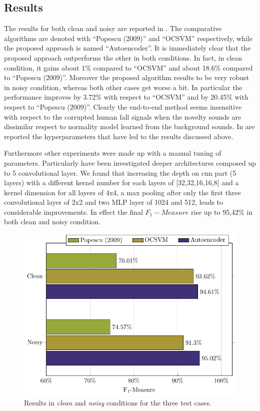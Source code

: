 \subsection{Results}
The results for both clean and noisy are reported in . The comparative algorithms are denoted with ``Popescu (2009)'' and ``OCSVM'' respectively, while the proposed approach is named ``Autoencoder''. It is immediately clear that the proposed approach outperforms the other in both conditions. In fact, in clean condition, it gains about 1\% compared to ``OCSVM'' and about 18.6\% compared to ``Popescu (2009)''. Moreover the proposed algorithm results to be very robust in noisy condition, %
whereas both other cases get worse a bit.
In particular the performance improves by 3.72\% with respect to ``OCSVM'' and by 20.45\% with respect to ``Popescu (2009)''. Clearly the end-to-end method seems insensitive with respect to the corrupted human fall signals when the novelty sounds are dissimilar respect to normality model learned from the background sounds. 
In  are reported the hyperparameters that have led to the results discussed above.

Furthermore other experiments were made up with a manual tuning of parameters. Particularly have been investigated deeper architectures composed up to 5 convolutional layer. We found that increasing the depth on cnn part (5 layers) with a different kernel number for each layers of [32,32,16,16,8] and a kernel dimension for all layers of 4x4, a max pooling after only the first three convolutional layer of 2x2 and two MLP layer of 1024 and 512, leads to considerable improvements. In effect the final $ F_1 -Measure$ rise up to 95,42\%  in both clean and noisy condition. 


\begin{figure}[t]
	\centering
	\includegraphics[width=0.75\columnwidth]{img/wirn2017/grafTex/results.pdf}
	\caption{Results in \textit{clean} and \textit{noisy} conditions for the three test cases.} 
	\label{fig:endtoend_results}
\end{figure}

